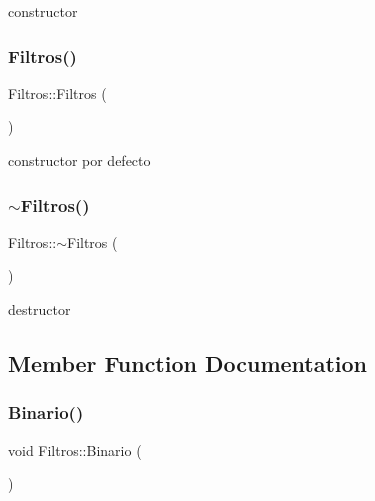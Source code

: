 constructor 

\mbox{\label{class_filtros_a5d4383dece49dcc80b3ce18da579a338}} 
\subsubsection{\texorpdfstring{Filtros()}{Filtros()}\hspace{0.1cm}{\footnotesize\ttfamily [2/2]}}
{\footnotesize\ttfamily Filtros\+::\+Filtros (\begin{DoxyParamCaption}{ }\end{DoxyParamCaption})\hspace{0.3cm}{\ttfamily [inline]}}



constructor por defecto 

\mbox{\label{class_filtros_ae0486e405aaac60c6f19eaef6b3b01df}} 
\subsubsection{\texorpdfstring{$\sim$\+Filtros()}{~Filtros()}}
{\footnotesize\ttfamily Filtros\+::$\sim$\+Filtros (\begin{DoxyParamCaption}{ }\end{DoxyParamCaption})\hspace{0.3cm}{\ttfamily [inline]}}



destructor 



\subsection{Member Function Documentation}
\mbox{\label{class_filtros_a85e035d3ce1a721331aba30535487a57}} 
\subsubsection{\texorpdfstring{Binario()}{Binario()}}
{\footnotesize\ttfamily void Filtros\+::\+Binario (\begin{DoxyParamCaption}{ }\end{DoxyParamCaption})}



